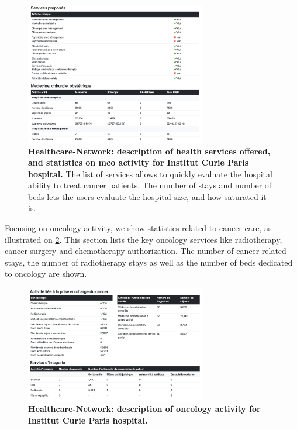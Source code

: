 \begin{figure}[H]
    \includegraphics[width=0.7\textwidth]{images/healthcare-network/curie-services.png}
    \centering
    \caption{ \textbf{Healthcare-Network: description of health services
            offered, and statistics on \ac{mco} activity for Institut Curie Paris
            hospital.} The list of services allows to quickly evaluate the
        hospital ability to treat cancer patients. The number of stays and number of
        beds lets the users evaluate the hospital size, and how saturated it is.}
    \label{fig:hn-curie-services}
\end{figure}

Focusing on oncology activity, we show statistics related to cancer care, as
illustrated on \cref{fig:hn-curie-cancero}. This section lists the key oncology
services like radiotherapy, cancer surgery and chemotherapy authorization. The
number of cancer related stays, the number of radiotherapy stays as well as the
number of beds dedicated to oncology are shown.

\begin{figure}[H]
    \includegraphics[width=0.7\textwidth]{images/healthcare-network/curie-cancero.png}
    \centering
    \caption{
        \textbf{Healthcare-Network: description of oncology activity for Institut Curie Paris hospital.}
    }
    \label{fig:hn-curie-cancero}
\end{figure}

